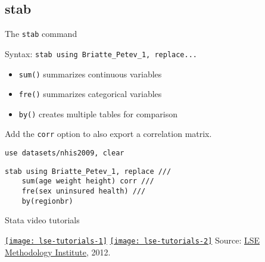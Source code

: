 \documentclass[t]{beamer}
\begin{document}
	\subsection{stab}

	\begin{frame}[t,fragile]{The \texttt{stab} command}

		\begin{block}{Syntax: \texttt{stab using Briatte\_Petev\_1, replace...}}

	        \begin{itemize}
	            \item \texttt{sum()} summarizes continuous variables
	            \item \texttt{fre()} summarizes categorical variables
	            \item \texttt{by()} creates multiple tables for comparison
	        \end{itemize}

			Add the \texttt{corr} option to also export a correlation matrix.

	    \end{block}

		\begin{exampleblock}{\texttt{use datasets/nhis2009, clear}}%
			\vspace{-1em}

	        \begin{verbatim}
stab using Briatte_Petev_1, replace ///
    sum(age weight height) corr ///
    fre(sex uninsured health) ///
    by(regionbr)\end{verbatim}

	    \end{exampleblock}

	\end{frame}

	\begin{frame}[c]{Stata video tutorials}

        \href{https://www.youtube.com/watch?v=AlEmUqMBx4A&feature=plcp}{\texttt{[image: lse-tutorials-1]}}%
		\hfill%
		\href{https://www.youtube.com/watch?v=0C_Hlh_jNq8&feature=plcp}{\texttt{[image: lse-tutorials-2]}}%
		\vfill%
		Source: \href{https://www.youtube.com/user/MethodologyLSE/videos?query=stata}{LSE Methodology Institute}, 2012.

    \end{frame}
\end{document}
